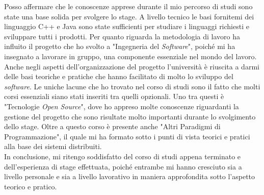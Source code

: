 Posso affermare che le conoscenze apprese durante il mio percorso di studi sono state una base solida per svolgere lo stage. A livello tecnico le basi fornitemi dei linguaggio C++ e Java sono state sufficienti per studiare i linguaggi richiesti e sviluppare tutti i prodotti. Per quanto riguarda la metodologia di lavoro ha influito il progetto che ho svolto a "Ingegneria del \textit{Software}", poiché mi ha insegnato a lavorare in gruppo, una componente essenziale nel mondo del lavoro. Anche negli aspetti dell'organizzazione del progetto l'università è riuscita a darmi delle basi teoriche e pratiche che hanno facilitato di molto lo sviluppo del \textit{software}. Le uniche lacune che ho trovato nel corso di studi sono il fatto che molti corsi essenziali siano stati inseriti tra quelli opzionali. Uno tra questi è "Tecnologie \textit{Open Source}", dove ho appreso molte conoscenze riguardanti la gestione del progetto che sono risultate molto importanti durante lo svolgimento dello stage. Oltre a questo corso è presente anche "Altri Paradigmi di Programmazione", il quale mi ha formato sotto i punti di vista teorici e pratici alla base dei sistemi distribuiti. \\

In conclusione, mi ritengo soddisfatto del corso di studi appena terminato e dell'esperienza di stage effettuata, poiché entrambe mi hanno cresciuto sia a livello personale e sia a livello lavorativo in maniera approfondita sotto l'aspetto teorico e pratico.
